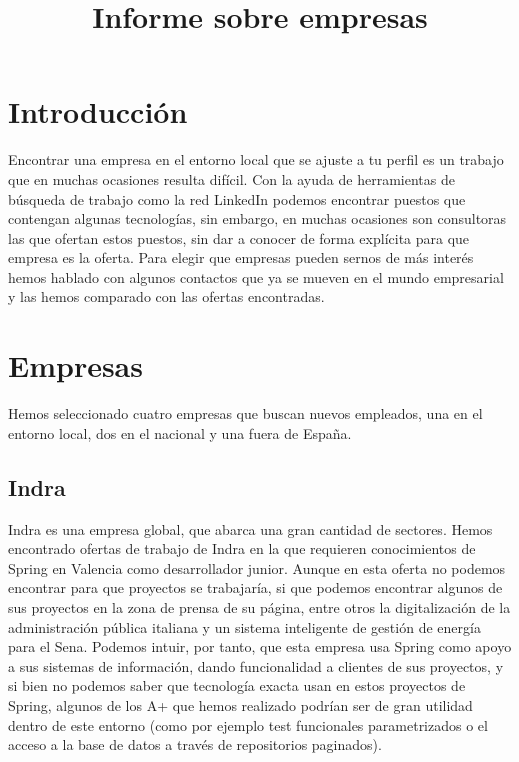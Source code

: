 \documentclass[a4paper]{article}
\title{Informe sobre empresas}
\date{}
\begin{document}
\setlength{\voffset}{-1in}
\setlength{\textheight}{680px}
\setlength{\headsep}{30px}
\maketitle

\section{Introducción}

Encontrar una empresa en el entorno local que se ajuste a tu perfil es un trabajo que en muchas ocasiones resulta difícil. Con la ayuda de herramientas de búsqueda de trabajo como la red LinkedIn podemos encontrar puestos que contengan algunas tecnologías, sin embargo, en muchas ocasiones son consultoras las que ofertan estos puestos, sin dar a conocer de forma explícita para que empresa es la oferta. Para elegir que empresas pueden sernos de más interés hemos hablado con algunos contactos que ya se mueven en el mundo empresarial y las hemos comparado con las ofertas encontradas.

\section{Empresas}

Hemos seleccionado cuatro empresas que buscan nuevos empleados, una en el entorno local, dos en el nacional y una fuera de España.

\subsection{Indra}
Indra es una empresa global, que abarca una gran cantidad de sectores. Hemos encontrado ofertas de trabajo de Indra en la que requieren conocimientos de Spring en Valencia como desarrollador junior. Aunque en esta oferta no podemos encontrar para que proyectos se trabajaría, si que podemos encontrar algunos de sus proyectos en la zona de prensa de su página, entre otros la digitalización de la administración pública italiana y un sistema inteligente de gestión de energía para el Sena. Podemos intuir, por tanto, que esta empresa usa Spring como apoyo a sus sistemas de información, dando funcionalidad a clientes de sus proyectos, y si bien no podemos saber que tecnología exacta usan en estos proyectos de Spring, algunos de los A+ que hemos realizado podrían ser de gran utilidad dentro de este entorno (como por ejemplo test funcionales parametrizados o el acceso a la base de datos a través de repositorios paginados).
\end{document}
